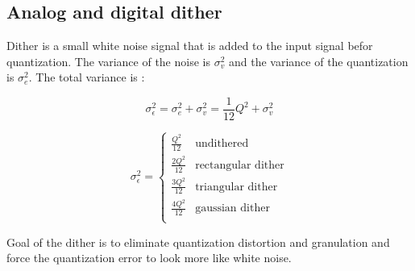 \subsection{Analog and digital dither}
Dither is a small white noise signal that is added to the input signal befor quantization. The variance of the noise is $\sigma_v^2$ and the variance of the quantization is $\sigma_e^2$. The total variance is :

\[ \sigma_{\epsilon}^2 = \sigma_e^2 + \sigma_v^2 =\frac{1}{12}Q^2+\sigma_v^2\]

\begin{equation*}
	\sigma_{\epsilon}^2 = 
	\begin{cases}
		\frac{Q^2}{12} & \text{undithered} \\
		\frac{2Q^2}{12} & \text{rectangular dither} \\
		\frac{3Q^2}{12} & \text{triangular dither} \\
		\frac{4Q^2}{12} & \text{gaussian dither} \\
	\end{cases}
\end{equation*}

Goal of the dither is to eliminate quantization distortion and granulation and force the quantization error to look more
like white noise.
